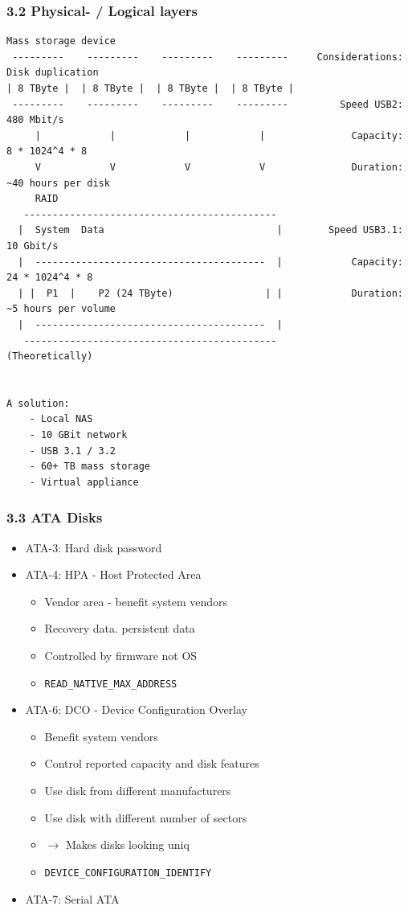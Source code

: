 \begin{frame}[fragile]
  \frametitle{3.2 Physical- / Logical layers}
  \begin{lstlisting}[basicstyle=\tiny]
	       Mass storage device
 ---------    ---------    ---------    ---------     Considerations: Disk duplication
| 8 TByte |  | 8 TByte |  | 8 TByte |  | 8 TByte |
 ---------    ---------    ---------    ---------         Speed USB2: 480 Mbit/s
     |            |            |            |               Capacity: 8 * 1024^4 * 8
     V            V            V            V               Duration: ~40 hours per disk
     RAID
   --------------------------------------------
  |  System  Data                              |        Speed USB3.1: 10 Gbit/s
  |  ----------------------------------------  |            Capacity: 24 * 1024^4 * 8
  | |  P1  |    P2 (24 TByte)                | |            Duration: ~5 hours per volume
  |  ----------------------------------------  |
   --------------------------------------------             (Theoretically)


A solution:
	- Local NAS
	- 10 GBit network
	- USB 3.1 / 3.2
	- 60+ TB mass storage
	- Virtual appliance
  \end{lstlisting}
\end{frame}


\begin{frame}[fragile]
  \frametitle{3.3 ATA Disks }
    \begin{itemize}
        \item ATA-3: Hard disk password
        \item ATA-4: HPA - Host Protected Area
        \begin{itemize}
            \item Vendor area - benefit system vendors
            \item Recovery data. persistent data
            \item Controlled by firmware not OS
            \item \texttt{READ\_NATIVE\_MAX\_ADDRESS}
        \end{itemize}
        \item ATA-6: DCO - Device Configuration Overlay
        \begin{itemize}
            \item Benefit system vendors
            \item Control reported capacity and disk features
            \item Use disk from different manufacturers
            \item Use disk with different number of sectors
            \item[] $\to$ Makes disks looking uniq
            \item \texttt{DEVICE\_CONFIGURATION\_IDENTIFY}
        \end{itemize}
        \item ATA-7: Serial ATA
    \end{itemize}
\end{frame}


